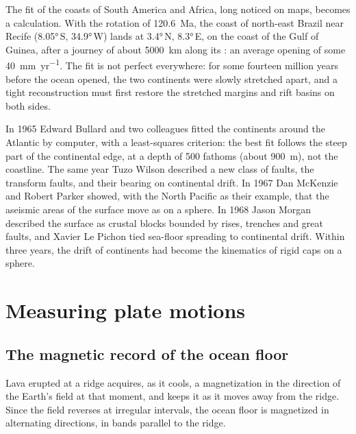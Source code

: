 The fit of the coasts of South America and Africa, long noticed on maps,
becomes a calculation. With the rotation of
\qty{120.6}{Ma}, the coast of north-east Brazil near Recife (\ang{8.05}\,S,
\ang{34.9}\,W) lands at \ang{3.4}\,N, \ang{8.3}\,E, on the coast of the Gulf of
Guinea, after a journey of about \qty{5000}{km} along its : an
average opening of some \qty{40}{mm.yr^{-1}}. The fit is not perfect
everywhere: for some fourteen million years before the ocean opened, the two
continents were slowly stretched apart, and a tight reconstruction must first
restore the stretched margins and rift basins on both sides.

\begin{history}
In 1965 Edward Bullard and two colleagues fitted the continents around the
Atlantic by computer, with a least-squares criterion: the best fit follows the
steep part of the continental edge, at a depth of 500 fathoms (about
\qty{900}{m}), not the coastline. The same year Tuzo Wilson described a new
class of faults, the transform faults, and their bearing on continental drift.
In 1967 Dan McKenzie and Robert Parker showed, with the North Pacific as their
example, that the aseismic areas of the surface move as  on a
sphere. In 1968 Jason Morgan described the surface as crustal blocks bounded by
rises, trenches and great faults, and Xavier Le Pichon tied sea-floor spreading
to continental drift. Within three years, the drift of continents had become the
kinematics of rigid caps on a sphere.
\end{history}

\section{Measuring plate motions}

\subsection*{The magnetic record of the ocean floor}

Lava erupted at a ridge acquires, as it cools, a magnetization in the direction
of the Earth's field at that moment, and keeps it as it moves away from the
ridge. Since the field reverses at irregular intervals, the ocean floor is
magnetized in alternating directions, in bands parallel to the ridge.

